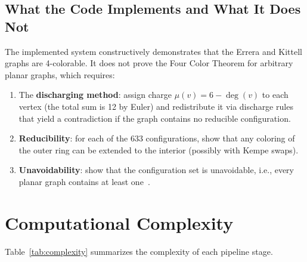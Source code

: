 \documentclass[12pt,letterpaper]{article}
\theoremstyle{plain}
\theoremstyle{definition}
\theoremstyle{remark}
\newcommand{\degr}{\operatorname{deg}}
\begin{document}
\subsection{What the Code Implements and What It Does Not}

The implemented system constructively demonstrates that the Errera and Kittell
graphs are 4-colorable. It does not prove the Four Color Theorem for arbitrary
planar graphs, which requires:

\begin{enumerate}[noitemsep]
    \item The \textbf{discharging method}: assign charge $\mu(v) = 6 - \degr(v)$
        to each vertex (the total sum is 12 by Euler) and redistribute it via
        discharge rules that yield a contradiction if the graph contains no
        reducible configuration.
    \item \textbf{Reducibility}: for each of the 633 configurations, show that
        any coloring of the outer ring can be extended to the interior (possibly
        with Kempe swaps).
    \item \textbf{Unavoidability}: show that the configuration set is unavoidable,
        i.e., every planar graph contains at least one~\cite{robertson1997}.
\end{enumerate}

\section{Computational Complexity}
\label{sec:complexity}

Table~\ref{tab:complexity} summarizes the complexity of each pipeline stage.
\end{document}
